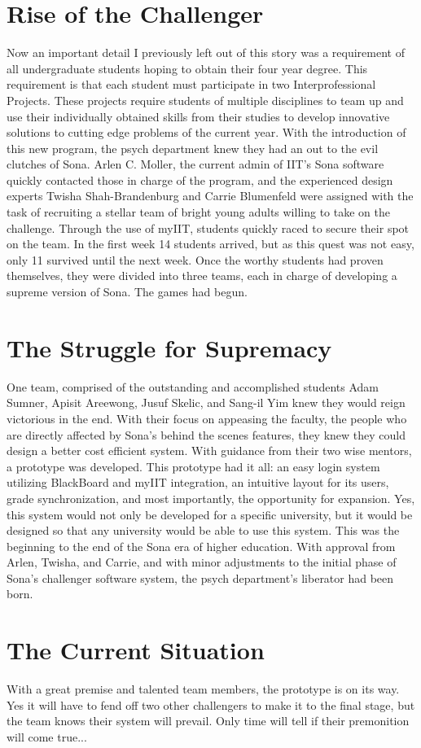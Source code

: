 \documentclass[12pt]{article}
\begin{document}
\section*{Rise of the Challenger}
Now an important detail I previously left out of this story was a requirement of all undergraduate students hoping to obtain their four year degree. This requirement is that each student must participate in two Interprofessional Projects. These projects require students of multiple disciplines to team up and use their individually obtained skills from their studies to develop innovative solutions to cutting edge problems of the current year. With the introduction of this new program, the psych department knew they had an out to the evil clutches of Sona. Arlen C. Moller, the current admin of IIT's Sona software quickly contacted those in charge of the program, and the experienced design experts Twisha Shah-Brandenburg and Carrie Blumenfeld were assigned with the task of recruiting a stellar team of bright young adults willing to take on the challenge. Through the use of myIIT, students quickly raced to secure their spot on the team. In the first week 14 students arrived, but as this quest was not easy, only 11 survived until the next week. Once the worthy students had proven themselves, they were divided into three teams, each in charge of developing a supreme version of Sona. The games had begun.

\section*{The Struggle for Supremacy}
One team, comprised of the outstanding and accomplished students Adam Sumner, Apisit Areewong, Jusuf Skelic, and Sang-il Yim knew they would reign victorious in the end. With their focus on appeasing the faculty, the people who are directly affected by Sona's behind the scenes features, they knew they could design a better cost efficient system. With guidance from their two wise mentors, a prototype was developed. This prototype had it all: an easy login system utilizing BlackBoard and myIIT integration, an intuitive layout for its users, grade synchronization, and most importantly, the opportunity for expansion. Yes, this system would not only be developed for a specific university, but it would be designed so that any university would be able to use this system. This was the beginning to the end of the Sona era of higher education. With approval from Arlen, Twisha, and Carrie, and with minor adjustments to the initial phase of Sona's challenger software system, the psych department's liberator had been born.
\newpage
\section*{The Current Situation}
With a great premise and talented team members, the prototype is on its way. Yes it will have to fend off two other challengers to make it to the final stage, but the team knows their system will prevail. Only time will tell if their premonition will come true...
\end{document}
